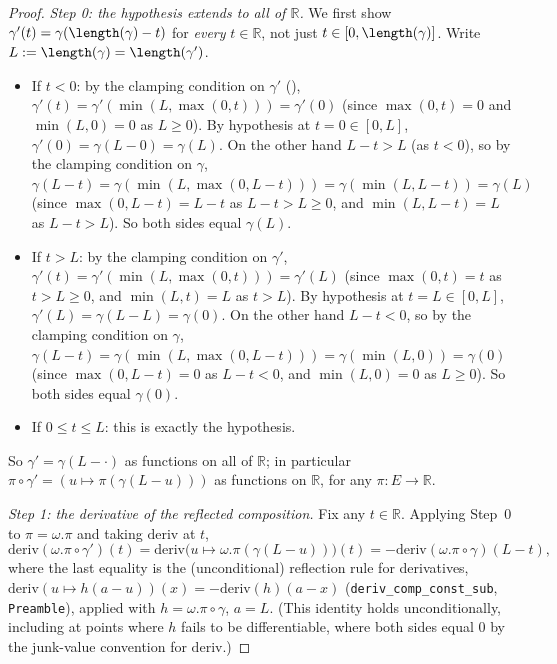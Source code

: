 \begin{proof}
  \emph{Step 0: the hypothesis extends to all of $\mathbb{R}$.} We first show
  $\gamma'(t) = \gamma(\length(\gamma)-t)$ for \emph{every} $t \in \mathbb{R}$, not just
  $t \in [0,\length(\gamma)]$. Write $L := \length(\gamma) = \length(\gamma')$.
  \begin{itemize}
    \item If $t < 0$: by the clamping condition on $\gamma'$ (),
      $\gamma'(t) = \gamma'(\min(L,\max(0,t))) = \gamma'(0)$ (since $\max(0,t)=0$ and $\min(L,0)=0$
      as $L \ge 0$). By hypothesis at $t=0 \in [0,L]$, $\gamma'(0) = \gamma(L-0) = \gamma(L)$. On the
      other hand $L - t > L$ (as $t<0$), so by the clamping condition on $\gamma$,
      $\gamma(L-t) = \gamma(\min(L,\max(0,L-t))) = \gamma(\min(L,L-t)) = \gamma(L)$ (since
      $\max(0,L-t)=L-t$ as $L-t>L\ge0$, and $\min(L,L-t)=L$ as $L-t>L$). So both sides equal
      $\gamma(L)$.
    \item If $t > L$: by the clamping condition on $\gamma'$,
      $\gamma'(t) = \gamma'(\min(L,\max(0,t))) = \gamma'(L)$ (since $\max(0,t)=t$ as $t>L\ge0$, and
      $\min(L,t)=L$ as $t>L$). By hypothesis at $t=L \in [0,L]$, $\gamma'(L) = \gamma(L-L)=\gamma(0)$.
      On the other hand $L-t<0$, so by the clamping condition on $\gamma$,
      $\gamma(L-t) = \gamma(\min(L,\max(0,L-t))) = \gamma(\min(L,0)) = \gamma(0)$ (since
      $\max(0,L-t)=0$ as $L-t<0$, and $\min(L,0)=0$ as $L\ge0$). So both sides equal $\gamma(0)$.
    \item If $0 \le t \le L$: this is exactly the hypothesis.
  \end{itemize}
  So $\gamma' = \gamma(L - \cdot)$ as functions on all of $\mathbb{R}$; in particular
  $\pi \circ \gamma' = (u \mapsto \pi(\gamma(L-u)))$ as functions on $\mathbb{R}$, for any
  $\pi \colon E \to \mathbb{R}$.

  \emph{Step 1: the derivative of the reflected composition.} Fix any $t \in \mathbb{R}$. Applying
  Step~0 to $\pi = \omega.\pi$ and taking $\mathrm{deriv}$ at $t$,
  \[
    \mathrm{deriv}(\omega.\pi \circ \gamma')(t) = \mathrm{deriv}\bigl(u \mapsto \omega.\pi(\gamma(L-u))\bigr)(t)
    = -\mathrm{deriv}(\omega.\pi\circ\gamma)(L-t)
    ,
  \]
  where the last equality is the (unconditional) reflection rule for derivatives,
  $\mathrm{deriv}(u \mapsto h(a-u))(x) = -\mathrm{deriv}(h)(a-x)$ (\texttt{deriv\_comp\_const\_sub},
  \texttt{Preamble}), applied with $h = \omega.\pi\circ\gamma$, $a=L$. (This identity holds
  unconditionally, including at points where $h$ fails to be differentiable, where both sides
  equal $0$ by the junk-value convention for $\mathrm{deriv}$.)


\end{proof}
